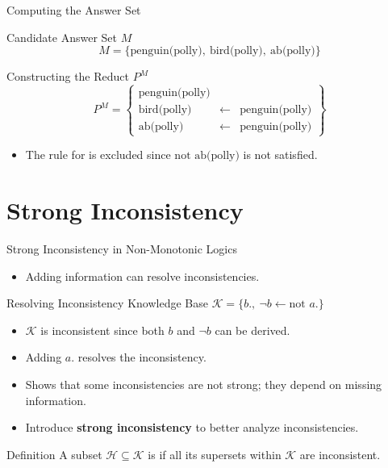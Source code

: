 \begin{frame}{Computing the Answer Set}
    \begin{block}{Candidate Answer Set \(M\)}
        \[
            M = \{\text{penguin(polly)},\ \text{bird(polly)},\ \text{ab(polly)}\}
        \]
    \end{block}
    \begin{block}{Constructing the Reduct \(P^M\)}
        \[
            P^M = \left\{
            \begin{array}{lcl}
                \text{penguin(polly)} &            &                       \\
                \text{bird(polly)}    & \leftarrow & \text{penguin(polly)} \\
                \text{ab(polly)}      & \leftarrow & \text{penguin(polly)}
            \end{array}
            \right\}
        \]
        \begin{itemize}
            \item The rule for  is excluded since \(\text{not }\text{ab(polly)}\) is not satisfied.
        \end{itemize}
    \end{block}
\end{frame}

\section{Strong Inconsistency}

\begin{frame}{Strong Inconsistency in Non-Monotonic Logics}
    \begin{itemize}
        \item Adding information can resolve inconsistencies.
    \end{itemize}
    \begin{exampleblock}{Resolving Inconsistency}
        Knowledge Base \( \mathcal{K} = \{ b.,\ \neg b \leftarrow \text{not }a. \} \)
        \begin{itemize}
            \item \( \mathcal{K} \) is inconsistent since both \( b \) and \( \neg b \) can be derived.
            \item Adding \( a. \) resolves the inconsistency.
            \item Shows that some inconsistencies are not strong; they depend on missing information.
        \end{itemize}
    \end{exampleblock}
    \begin{itemize}
        \item Introduce \textbf{strong inconsistency} to better analyze inconsistencies.
    \end{itemize}
    \begin{block}{Definition}
        A subset \( \mathcal{H} \subseteq \mathcal{K} \) is  if all its supersets within \( \mathcal{K} \) are inconsistent.
    \end{block}
\end{frame}

